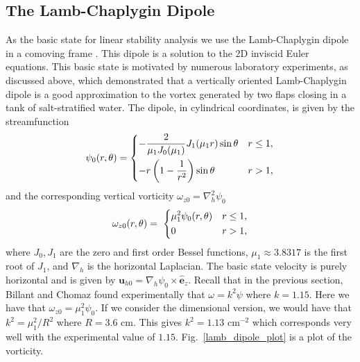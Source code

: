 \subsection{The Lamb-Chaplygin Dipole} 
As the basic state for linear stability analysis we use the Lamb-Chaplygin dipole in a comoving frame \cite{meleshko1994}. This dipole is a solution to the 2D inviscid Euler equations. This basic state is motivated by numerous laboratory experiments\cite{bc2000a,leweke1998}, as discussed above, which demonstrated that a vertically oriented Lamb-Chaplygin dipole is a good approximation to the vortex generated by two flaps closing in a tank of salt-stratified water. The dipole, in cylindrical coordinates, is given by the streamfunction
\begin{align}
\psi_{0}(r,\theta) = 
\begin{dcases}
-\frac{2}{\mu_{1}J_{0}(\mu_{1})}J_{1}(\mu_{1}r)\sin\theta & r\le 1,\\\label{lc_dipole_sf}
-r\left(1-\frac{1}{r^{2}}\right)\sin\theta & r>1 ,
\end{dcases}
\end{align}
and the corresponding vertical vorticity $\omega_{z0}=\nabla_{h}^{2}\psi_{0}$
\begin{align}
\omega_{z0}(r,\theta) = \
\begin{dcases}
\mu_{1}^{2}\psi_{0}(r,\theta) & r\le 1,\\
0 & r>1,
\end{dcases}
\end{align}
where $J_{0},J_{1}$ are the zero and first order Bessel functions, $\mu_{1}\approx 3.8317$ is the first root of $J_{1}$, and $\nabla_{h}$ is the horizontal Laplacian. The basic state velocity is purely horizontal and is given by $\bm{u}_{h0}=\nabla_{h}\psi_{0}\times\hat{\bm{e}}_{z}$. Recall that in the previous section, Billant and Chomaz found experimentally that $\omega = k^{2}\psi$ where $k=1.15$. Here we have that $\omega_{z0}=\mu_{1}^{2}\psi_{0}$. If we consider the dimensional version, we would have that $k^{2} = \mu_{1}^{2}/R^{2}$ where $R=3.6$ cm. This gives $k^{2} = 1.13 \text{ cm}^{-2}$ which corresponds very well with the experimental value of $1.15$. Fig.~\ref{lamb_dipole_plot} is a plot of the vorticity. 

